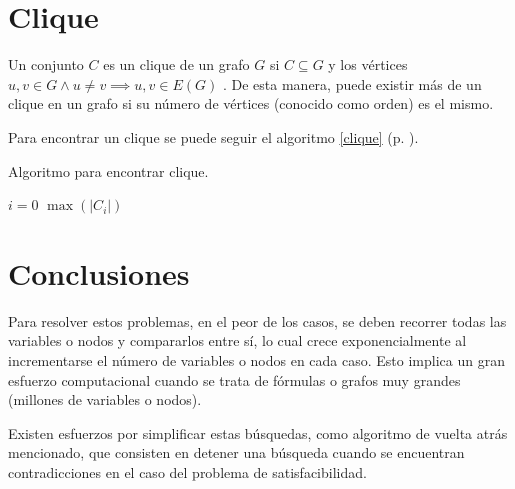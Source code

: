 \documentclass[paper=leter, fontsize=11pt]{scrartcl}
\numberwithin{equation}{section}		%
\numberwithin{figure}{section}			%
\numberwithin{table}{section}				%
\begin{document}
\section{Clique}

Un conjunto $C$ es un clique de un grafo $G$ si $C \subseteq G$ y los vértices $u, v \in G \land u \neq v \implies u, v \in E(G)$ \cite{clique}. De esta manera, puede existir más de un clique en un grafo si su número de vértices (conocido como orden) es el mismo.

Para encontrar un clique se puede seguir el algoritmo \ref{clique} (p. \pageref{clique}).

\begin{algorithm} %
	\caption{Algoritmo para encontrar clique.}
	\label{clique}
	\SetAlgoLined

	\(i = 0\)\;
	\Return \(\max(|C_i|)\)
\end{algorithm}

\section{Conclusiones}

Para resolver estos problemas, en el peor de los casos, se deben recorrer todas las variables o nodos y compararlos entre sí, lo cual crece exponencialmente al incrementarse el número de variables o nodos en cada caso. Esto implica un gran esfuerzo computacional cuando se trata de fórmulas o grafos muy grandes (millones de variables o nodos). 

Existen esfuerzos por simplificar estas búsquedas, como algoritmo de vuelta atrás mencionado, que consisten en detener una búsqueda cuando se encuentran contradicciones en el caso del problema de satisfacibilidad.




\end{document}
